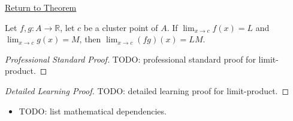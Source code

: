 \newpage
{}
\label{prf:limit-product}

\begin{remark*}[Return]
\hyperref[thm:limit-product]{Return to Theorem}
\end{remark*}

\begin{theorem*}
Let $f, g : A \to \mathbb{R}$, let $c$ be a cluster point of $A$. If
$\lim_{x\to c}f(x)=L$ and $\lim_{x\to c}g(x)=M$, then
$\lim_{x\to c}(fg)(x) = LM$.
\end{theorem*}

\begin{proof}[Professional Standard Proof]
\LRAProofBodyStart
TODO: professional standard proof for limit-product.
\end{proof}

\begin{proof}[Detailed Learning Proof]
\LRAProofBodyStart
TODO: detailed learning proof for limit-product.
\end{proof}

\begin{remark*}
\end{remark*}

\begin{dependencies}
\begin{itemize}
  \item TODO: list mathematical dependencies.
\end{itemize}
\end{dependencies}

\clearpage
